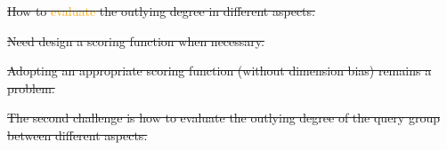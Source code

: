 \documentclass[
 size=14pt,
 paper=smartboard,  %
 mode=present, 		%
 display=slides, 	%
 style=tuliplab,  	%
 pauseslide,
 fleqn,leqno]{powerdot}
\providecommand{\DIFdeltex}[1]{{\protect\color{red}\sout{#1}}}                      %
\providecommand{\DIFdelbegin}{} %
\providecommand{\DIFdelend}{} %
\providecommand{\DIFdel}[1]{\texorpdfstring{\DIFdeltex{#1}}{}} %
\newcommand{\DIFscaledelfig}{0.5}
\newlength{\DIFdelgraphicswidth} %
\newlength{\DIFdelgraphicsheight} %
\newcommand{\DIFdelincludegraphics}[2][]{%
\sbox{\DIFdelgraphicsbox}{\DIFOincludegraphics[#1]{#2}}%
\settoboxwidth{\DIFdelgraphicswidth}{\DIFdelgraphicsbox} %
\settoboxtotalheight{\DIFdelgraphicsheight}{\DIFdelgraphicsbox} %
\scalebox{\DIFscaledelfig}{%
\parbox[b]{\DIFdelgraphicswidth}{\usebox{\DIFdelgraphicsbox}\\[-\baselineskip] \rule{\DIFdelgraphicswidth}{0em}}\llap{\resizebox{\DIFdelgraphicswidth}{\DIFdelgraphicsheight}{%
\setlength{\unitlength}{\DIFdelgraphicswidth}%
\begin{picture}(1,1)%
\thicklines\linethickness{2pt} %
{\color[rgb]{1,0,0}\put(0,0){\framebox(1,1){}}}%
{\color[rgb]{1,0,0}\put(0,0){\line( 1,1){1}}}%
{\color[rgb]{1,0,0}\put(0,1){\line(1,-1){1}}}%
\end{picture}%
}\hspace*{3pt}}} %
} %
\DeclareRobustCommand{\DIFdelbegin}{\DIFOdelbegin \let\includegraphics\DIFdelincludegraphics} %
\DeclareRobustCommand{\DIFdelend}{\DIFOaddend \let\includegraphics\DIFOincludegraphics} %
\begin{document}
\DIFdelbegin %
\DIFdelend %

\DIFdelbegin %
\DIFdel{How to \textcolor{orange}{evaluate} the outlying degree in different aspects.
}\DIFdelend %

\DIFdelbegin %
\DIFdel{Need design a scoring function when necessary.
}\DIFdelend %

\DIFdelbegin %
\DIFdel{Adopting an appropriate scoring function (without dimension bias) remains a problem.
}\DIFdelend %

\DIFdelbegin %
\DIFdelend %

\DIFdelbegin %
\DIFdel{The second challenge is how to evaluate the outlying degree of
the query group between different aspects.
}\DIFdelend %
\end{document}
